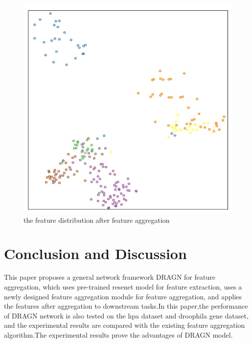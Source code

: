 \documentclass[10pt,twocolumn,letterpaper]{article}
\begin{document}
\begin{figure}[t]
\begin{center}
  \includegraphics[width=0.9\linewidth]{agg.JPG}
\end{center}
    \caption{the feature distribution after feature aggregation}
\label{fig:long}
\label{fig:onecol}
\end{figure}

\section{Conclusion and Discussion}
This paper proposes a general network framework DRAGN for feature aggregation, which uses pre-trained resenet model for feature extraction, uses a newly designed feature aggregation module for feature aggregation, and applies the features after aggregation to downstream tasks.In this paper,the performance of DRAGN network is also tested on the hpa dataset and droophila gene dataset, and the experimental results are compared with the existing feature aggregation algorithm.The experimental results prove the advantages of DRAGN model.
\end{document}
